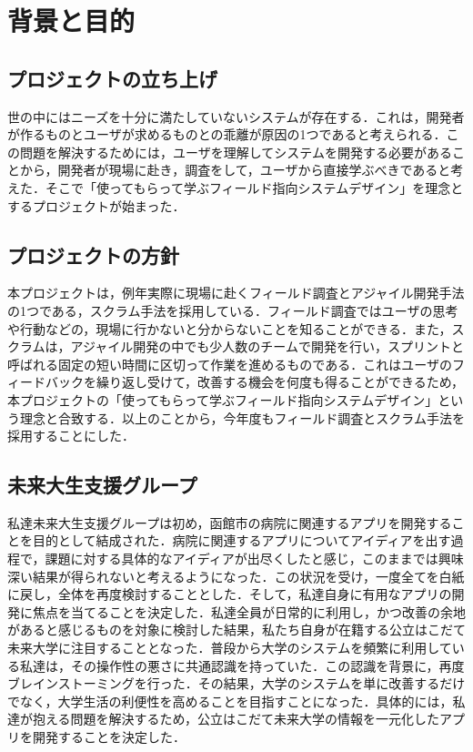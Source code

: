 \chapter{背景と目的}


\section{プロジェクトの立ち上げ}

世の中にはニーズを十分に満たしていないシステムが存在する．これは，開発者が作るものとユーザが求めるものとの乖離が原因の1つであると考えられる．この問題を解決するためには，ユーザを理解してシステムを開発する必要があることから，開発者が現場に赴き，調査をして，ユーザから直接学ぶべきであると考えた．そこで「使ってもらって学ぶフィールド指向システムデザイン」を理念とするプロジェクトが始まった．

\section{プロジェクトの方針}
本プロジェクトは，例年実際に現場に赴くフィールド調査とアジャイル開発手法の1つである，スクラム手法\cite{scrumb}を採用している．フィールド調査ではユーザの思考や行動などの，現場に行かないと分からないことを知ることができる．また，スクラムは，アジャイル開発の中でも少人数のチームで開発を行い，スプリントと呼ばれる固定の短い時間に区切って作業を進めるものである\cite{scrumb}．これはユーザのフィードバックを繰り返し受けて，改善する機会を何度も得ることができるため，本プロジェクトの「使ってもらって学ぶフィールド指向システムデザイン」という理念と合致する．以上のことから，今年度もフィールド調査とスクラム手法を採用することにした．

\section{未来大生支援グループ}\label{sec:gaiyou}
私達未来大生支援グループは初め，函館市の病院に関連するアプリを開発することを目的として結成された．病院に関連するアプリについてアイディアを出す過程で，課題に対する具体的なアイディアが出尽くしたと感じ，このままでは興味深い結果が得られないと考えるようになった．この状況を受け，一度全てを白紙に戻し，全体を再度検討することとした．そして，私達自身に有用なアプリの開発に焦点を当てることを決定した．私達全員が日常的に利用し，かつ改善の余地があると感じるものを対象に検討した結果，私たち自身が在籍する公立はこだて未来大学に注目することとなった．普段から大学のシステムを頻繁に利用している私達は，その操作性の悪さに共通認識を持っていた．この認識を背景に，再度ブレインストーミングを行った．その結果，大学のシステムを単に改善するだけでなく，大学生活の利便性を高めることを目指すことになった．具体的には，私達が抱える問題を解決するため，公立はこだて未来大学の情報を一元化したアプリを開発することを決定した．

